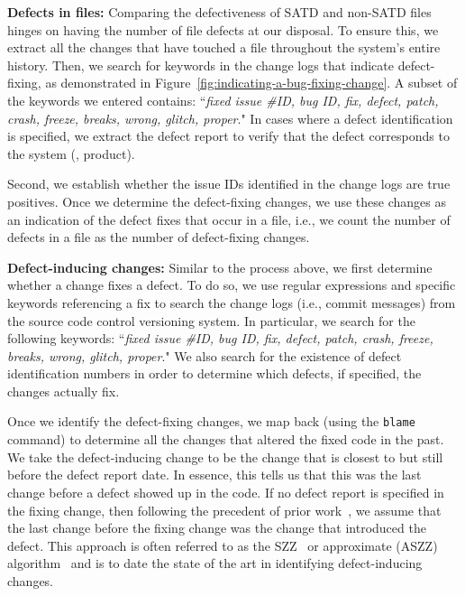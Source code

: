 \noindent\textbf{Defects in files:} Comparing the defectiveness of SATD and non-SATD files hinges on having the number of file defects at our disposal. To ensure this, we extract all the changes that have touched a file throughout the system's entire history. Then, we search for keywords in the change logs that indicate defect-fixing, as demonstrated in Figure~\ref{fig:indicating-a-bug-fixing-change}. A subset of the keywords we entered contains: ``\textit{fixed issue \#ID, bug ID, fix, defect, patch, crash, freeze, breaks, wrong, glitch, proper}." In cases where a defect identification is specified, we extract the defect report to verify that the defect corresponds to the system (\ie{}, product).

Second, we establish whether the issue IDs identified in the change logs are true positives. Once we determine the defect-fixing changes, we use these changes as an indication of the defect fixes that occur in a file, i.e., we count the number of defects in a file as the number of defect-fixing changes.


\noindent\textbf{Defect-inducing changes:} Similar to the process above, we first determine whether a change fixes a defect. To do so, we use regular expressions and specific keywords referencing a fix to search the change logs (i.e., commit messages) from the source code control versioning system. In particular, we search for the following keywords: ``\textit{fixed issue \#ID, bug ID, fix, defect,  patch, crash, freeze, breaks, wrong, glitch, proper}." We also search for the existence of defect identification numbers in order to determine which defects, if specified, the changes actually fix.

Once we identify the defect-fixing changes, we map back (using the \texttt{blame} command) to determine all the changes that altered the fixed code in the past. We take the defect-inducing change to be the change that is closest to but still before the defect report date. In essence, this tells us that this was the last change before a defect showed up in the code. If no defect report is specified in the fixing change, then following the precedent of prior work~\cite{Kamei-tse-2013}, we assume that the last change before the fixing change was the change that introduced the defect. This approach is often referred to as the SZZ~\cite{sliwerski-msr-2005} or approximate (ASZZ) algorithm~\cite{Kamei-tse-2013} and is to date the state of the art in identifying defect-inducing changes.


